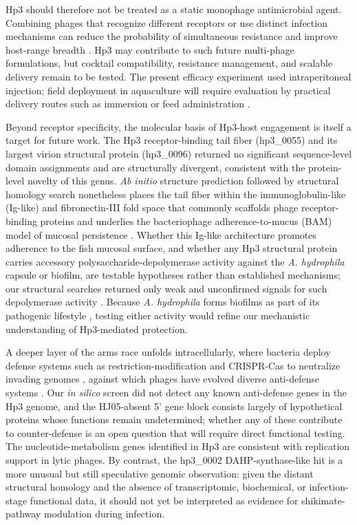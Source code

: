 Hp3 should therefore not be treated as a static monophage antimicrobial
agent. Combining phages that recognize different receptors or use
distinct infection mechanisms can reduce the probability of simultaneous
resistance and improve host-range breadth \citep{2021-Phage_Abedon,
2023-Developing_Oromi-Bosch}. Hp3 may contribute to such future
multi-phage formulations, but cocktail compatibility, resistance
management, and scalable delivery remain to be tested. The present
efficacy experiment used intraperitoneal injection; field deployment in
aquaculture will require evaluation by practical delivery routes such as
immersion or feed administration \citep{2021-Phage_Ramos-Vivas}.

Beyond receptor specificity, the molecular basis of Hp3-host engagement
is itself a target for future work. The Hp3 receptor-binding tail fiber
(hp3\_0055) and its largest virion structural protein (hp3\_0096)
returned no significant sequence-level domain assignments and are
structurally divergent, consistent with the protein-level novelty of
this genus. \emph{Ab initio} structure prediction followed by structural
homology search nonetheless places the tail fiber within the
immunoglobulin-like (Ig-like) and fibronectin-III fold space that commonly
scaffolds phage receptor-binding proteins and underlies the
bacteriophage adherence-to-mucus (BAM) model of mucosal persistence
\citep{2013-Bacteriophage_Barr, 2006-IgLike_Fraser, 2024-Bacteriophage_Wu}.
Whether this Ig-like architecture promotes adherence to the fish mucosal
surface, and whether any Hp3 structural protein carries accessory
polysaccharide-depolymerase activity against the \emph{A. hydrophila}
capsule or biofilm, are testable hypotheses rather than established
mechanisms; our structural searches returned only weak and unconfirmed
signals for such depolymerase activity \citep{2016-Bacteriophageencoded_Pires,
2023-Potential_Guo}. Because \emph{A. hydrophila} forms biofilms as part
of its pathogenic lifestyle \citep{2024-Tad_Tekedar}, testing either
activity would refine our mechanistic understanding of Hp3-mediated
protection.

A deeper layer of the arms race unfolds intracellularly, where bacteria
deploy defense systems such as restriction-modification and CRISPR-Cas
to neutralize invading genomes \citep{2010-Bacteriophage_Labrie},
against which phages have evolved diverse anti-defense systems
\citep{2024-Growing_Murtazalieva}. Our \emph{in silico} screen did not detect
any known anti-defense genes in the Hp3 genome, and the HJ05-absent 5'
gene block consists largely of hypothetical proteins whose functions
remain undetermined; whether any of these contribute to counter-defense
is an open question that will require direct functional testing. The
nucleotide-metabolism genes identified in Hp3 are consistent with
replication support in lytic phages. By contrast, the hp3\_0002
DAHP-synthase-like hit is a more unusual but still speculative genomic
observation: given the distant structural homology and the absence of
transcriptomic, biochemical, or infection-stage functional data, it
should not yet be interpreted as evidence for shikimate-pathway
modulation during infection.

